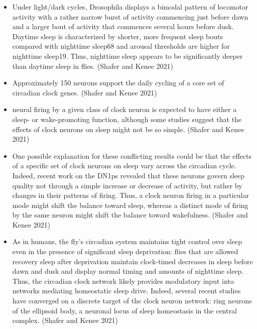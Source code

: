 \documentclass[11pt]{article}
\begin{document}
\begin{itemize}
    \item Under light/dark cycles, Drosophila displays a bimodal pattern of locomotor activity with a rather narrow burst of activity commencing just before dawn and a larger bout of activity that commences several hours before dusk.
    Daytime sleep is characterized by shorter, more frequent sleep bouts compared with nighttime sleep68 and arousal thresholds are higher for nighttime sleep19. Thus, nighttime sleep appears to be significantly deeper than daytime sleep in flies.
    \cite{shaferRegulationDrosophilaSleep2021} (Shafer and Kenee 2021)

    \item Approximately 150 neurons support the daily cycling of a core set of circadian clock genes.
    \cite{shaferRegulationDrosophilaSleep2021} (Shafer and Kenee 2021)

    \item neural firing by a given class of clock neuron is expected to have either a sleep- or wake-promoting function, although some studies suggest that the effects of clock neurons on sleep might not be so simple.
    \cite{shaferRegulationDrosophilaSleep2021} (Shafer and Kenee 2021)

    \item One possible explanation for these conflicting results could be that the effects of a specific set of clock neurons on sleep vary across the circadian cycle.
    Indeed, recent work on the DN1ps revealed that these neurons govern sleep quality not through a simple increase or decrease of activity, but rather by changes in their patterns of firing.
    Thus, a clock neuron firing in a particular mode might shift the balance toward sleep, whereas a distinct mode of firing by the same neuron might shift the balance toward wakefulness.
    \cite{shaferRegulationDrosophilaSleep2021} (Shafer and Kenee 2021)

    \item As in humans, the fly’s circadian system maintains tight control over sleep even in the presence of significant sleep deprivation: flies that are allowed recovery sleep after deprivation maintain clock-timed decreases in sleep before dawn and dusk and display normal timing and amounts of nighttime sleep.
    Thus, the circadian clock network likely provides modulatory input into networks mediating homeostatic sleep drive. Indeed, several recent studies have converged on a discrete target of the clock neuron network: ring neurons of the ellipsoid body, a neuronal locus of sleep homeostasis in the central complex.
    \cite{shaferRegulationDrosophilaSleep2021} (Shafer and Kenee 2021)


\end{itemize}
\end{document}
